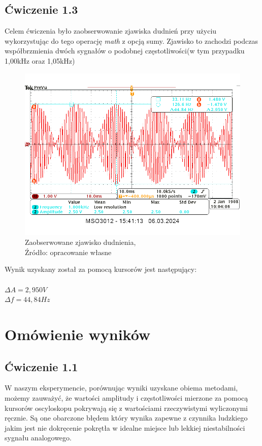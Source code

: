 \documentclass{article}
\begin{document}
    \subsection{Ćwiczenie 1.3}
      Celem ćwiczenia było zaobserwowanie zjawiska dudnień przy użyciu wykorzystując do tego operację \textit{math} z opcją sumy. Zjawisko to zachodzi podczas współbrzmienia dwóch sygnałów o podobnej częstotliwości(w tym przypadku  1,00kHz oraz 1,05kHz)
        \begin{figure}[!ht]
          \begin{center}
              \includegraphics[scale=0.4]{grafiki/dudnienia_kursory.png}
              \caption{Zaobserwowane zjawisko dudnienia,\\Źródło: opracowanie własne}
          \end{center}
        \end{figure}

        Wynik uzyskany został za pomocą kursorów jest następujący:\\ \\
        $\Delta A = 2,950 V$ \\
        $\Delta f = 44,84 Hz$ \\

  \section{Omówienie wyników}
        \subsection{Ćwiczenie 1.1}
          W naszym eksperymencie, porównując wyniki uzyskane obiema metodami, możemy zauważyć, że wartości amplitudy i częstotliwości mierzone za pomocą kursorów oscyloskopu pokrywają się z wartościami rzeczywistymi wyliczonymi ręcznie. Są one obarczone błędem który wynika zapewne z czynnika ludzkiego jakim jest nie dokręcenie pokrętła w idealne miejsce lub lekkiej niestabilności sygnału analogowego.
\end{document}
